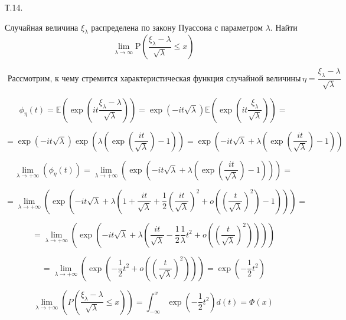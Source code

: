 \documentclass[a4paper,12pt]{article} %
\begin{document}
\begin{example} Т.14. 

Случайная величина $\xi_{\lambda}$ распределена по закону Пуассона с параметром $\lambda .$ Найти
$$
\lim _{\lambda \rightarrow \infty} \mathrm{P}\left(\frac{\xi_{\lambda}-\lambda}{\sqrt{\lambda}} \leqslant x\right)
$$



$$
\text { Рассмотрим, к чему стремится характеристическая функция случайной величины } \eta=\frac{\xi_{\lambda}-\lambda}{\sqrt{\lambda}}
$$


$$
\phi_{\eta}(t)=\mathbb{E}\left(\exp \left(i t \frac{\xi_{\lambda}-\lambda}{\sqrt{\lambda}}\right)\right)=\exp (-i t \sqrt{\lambda}) \mathbb{E}\left(\exp \left(i t \frac{\xi_{\lambda}}{\sqrt{\lambda}}\right)\right)=
$$


$$
=\exp (-i t \sqrt{\lambda}) \exp \left(\lambda\left(\exp \left(\frac{i t}{\sqrt{\lambda}}\right)-1\right)\right)=\exp \left(-i t \sqrt{\lambda}+\lambda\left(\exp \left(\frac{i t}{\sqrt{\lambda}}\right)-1\right)\right)
$$


$$
\lim _{\lambda \rightarrow+\infty}\left(\phi_{\eta}(t)\right)=\lim _{\lambda \rightarrow+\infty}\left(\exp \left(-i t \sqrt{\lambda}+\lambda\left(\exp \left(\frac{i t}{\sqrt{\lambda}}\right)-1\right)\right)\right)=
$$


$$
=\lim _{\lambda \rightarrow+\infty}\left(\exp \left(-i t \sqrt{\lambda}+\lambda\left(1+\frac{i t}{\sqrt{\lambda}}+\frac{1}{2}\left(\frac{i t}{\sqrt{\lambda}}\right)^{2}+o\left(\left(\frac{t}{\sqrt{\lambda}}\right)^{2}\right)-1\right)\right)\right)=
$$


$$
=\lim _{\lambda \rightarrow+\infty}\left(\exp \left(-i t \sqrt{\lambda}+\lambda\left(\frac{i t}{\sqrt{\lambda}}-\frac{1}{2} \frac{1}{\lambda} t^{2}+o\left(\left(\frac{t}{\sqrt{\lambda}}\right)^{2}\right)\right)\right)\right)
$$



$$
=\lim _{\lambda \rightarrow+\infty}\left(\exp \left(-\frac{1}{2} t^{2}+o\left(\left(\frac{t}{\sqrt{\lambda}}\right)^{2}\right)\right)\right)=\exp \left(-\frac{1}{2} t^{2}\right)
$$


$$
\lim _{\lambda \rightarrow+\infty}\left(P\left(\frac{\xi_{\lambda}-\lambda}{\sqrt{\lambda}} \leq x\right)\right)=\int_{-\infty}^{x} \exp \left(-\frac{1}{2} t^{2}\right) d(t)=\Phi(x)
$$








\end{example}
\end{document}
